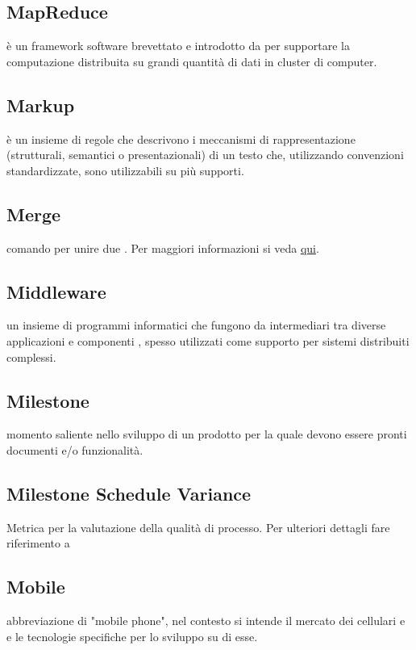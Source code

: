 \documentclass[12pt,a4paper]{article}
\begin{document}
\subsection{MapReduce} 
 è un framework software brevettato e introdotto da  per supportare la computazione distribuita su grandi quantità di dati in cluster di computer.

\subsection{Markup} 
 è un insieme di regole che descrivono i meccanismi di rappresentazione (strutturali, semantici o presentazionali) di un testo che, utilizzando convenzioni standardizzate, sono utilizzabili su più supporti.

\subsection{Merge} 
 comando  per unire due . Per maggiori informazioni si veda \href{https://git-scm.com/docs/}{qui}.

\subsection{Middleware} 
 un insieme di programmi informatici che fungono da intermediari tra diverse applicazioni e componenti ,  spesso utilizzati come supporto per sistemi distribuiti complessi.


\subsection{Milestone} 
 momento saliente nello sviluppo di un prodotto  per la quale devono essere pronti documenti e/o funzionalità.

\subsection{Milestone Schedule Variance}
 Metrica per la valutazione della qualità di processo. Per ulteriori dettagli fare riferimento a \PdQ{}

\subsection{Mobile} 
 abbreviazione di "mobile phone", nel contesto si intende il mercato dei cellulari e  e le tecnologie specifiche per lo sviluppo su di esse.
\end{document}
